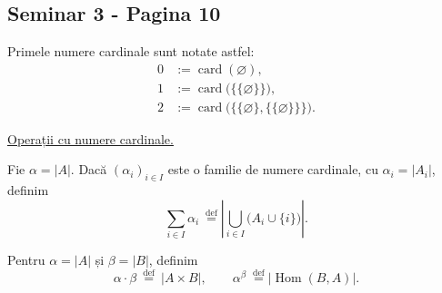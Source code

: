 
\subsection*{Seminar 3 - Pagina 10}
\begingroup
\setlength{\abovedisplayskip}{5pt}
\setlength{\belowdisplayskip}{5pt}
\setlength{\abovedisplayshortskip}{3pt}
\setlength{\belowdisplayshortskip}{3pt}

\noindent Primele numere cardinale sunt notate astfel:
\[
\begin{aligned}
0 &:= \operatorname{card}(\varnothing),\\
1 &:= \operatorname{card}\bigl(\{\{\varnothing\}\}\bigr),\\
2 &:= \operatorname{card}\bigl(\{\{\varnothing\},\{\{\varnothing\}\}\}\bigr).
\end{aligned}
\]

\medskip
\noindent\underline{Operații cu numere cardinale.}

Fie $\alpha=|A|$. Dacă $(\alpha_i)_{i\in I}$ este o familie de numere
cardinale, cu $\alpha_i=|A_i|$, definim
\[
\sum_{i\in I}\alpha_i\ \overset{\mathrm{def}}{=}
\left|\bigcup_{i\in I}\bigl(A_i\cup\{i\}\bigr)\right|.
\]

\noindent Pentru $\alpha=|A|$ și $\beta=|B|$, definim
\[
\alpha\cdot\beta\ \overset{\mathrm{def}}{=}\ |A\times B|,
\qquad
\alpha^{\beta}\ \overset{\mathrm{def}}{=}
\bigl|\operatorname{Hom}(B,A)\bigr|.
\]

